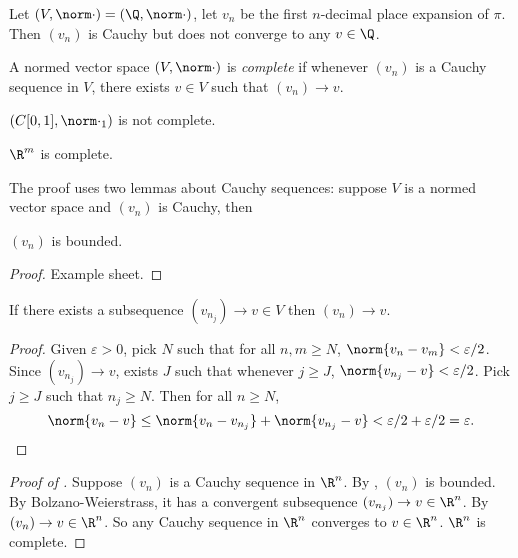 \documentclass[a4paper]{article}
\theoremstyle{definition}
\begin{document}
\begin{eg}
  Let \((V, \norm \cdot) = (\Q, \norm \cdot)\), let \(v_n\) be the first \(n\)-decimal place expansion of \(\pi\). Then \((v_n)\) is Cauchy but does not converge to any \(v\in \Q\).
\end{eg}

\begin{definition}[Completeness]
  A normed vector space \((V, \norm \cdot)\) is \emph{complete} if whenever \((v_n)\) is a Cauchy sequence in \(V\), there exists \(v\in V\) such that \((v_n) \to v\).
\end{definition}

\begin{eg}
  \((C[0, 1], \norm \cdot_1)\) is not complete.
\end{eg}

\begin{theorem}
  \label{thm:completeness of R}
  \(\R^m\) is complete.
\end{theorem}

The proof uses two lemmas about Cauchy sequences: suppose \(V\) is a normed vector space and \((v_n)\) is Cauchy, then

\begin{lemma}
  \label{lem:boundedness of Cauchy}
  \((v_n)\) is bounded.
\end{lemma}

\begin{proof}
  Example sheet.
\end{proof}

\begin{lemma}
  \label{lem:subsequence of Cauchy}
  If there exists a subsequence \((v_{n_j}) \to v \in V\) then \((v_n) \to v\).
\end{lemma}

\begin{proof}
  Given \(\varepsilon > 0\), pick \(N\) such that for all \(n, m \geq N\), \(\norm{v_n - v_m} < \varepsilon/2\). Since \((v_{n_j}) \to v\), exists \(J\) such that whenever \(j \geq J\), \(\norm{v_{n_j} - v} < \varepsilon/2\). Pick \(j \geq J\) such that \(n_j \geq N\). Then for all \(n\geq N\),
  \[
    \norm{v_n - v} \leq \norm{v_n - v_{n_j}} + \norm{v_{n_j} - v} < \varepsilon/2 + \varepsilon/2 = \varepsilon.
  \]
\end{proof}

\begin{proof}[Proof of ]
  Suppose \((v_n)\) is a Cauchy sequence in \(\R^n\). By , \((v_n)\) is bounded. By Bolzano-Weierstrass, it has a convergent subsequence \((v_{n_j}) \to v \in \R^n\). By  \((v_n) \to v \in \R^n\). So any Cauchy sequence in \(\R^n\) converges to \(v\in \R^n\). \(\R^n\) is complete.
\end{proof}
\end{document}
